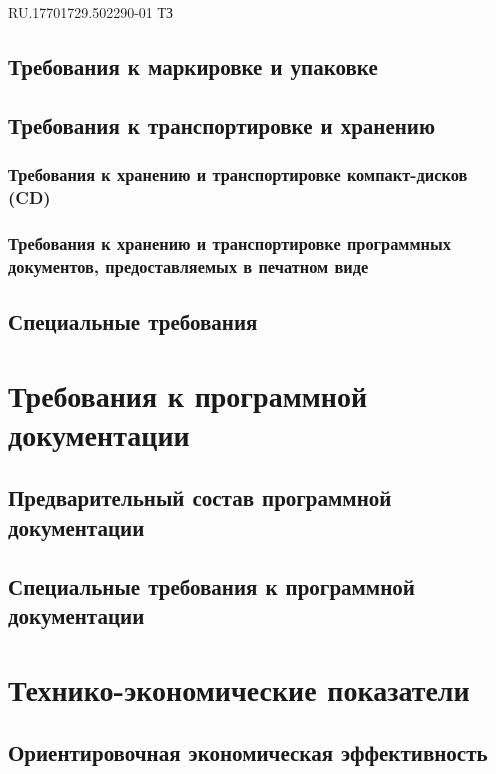 \begin{uspd}{RU.17701729.502290-01 ТЗ}
    

\subsection{Требования к маркировке и упаковке}

    
\subsection{Требования к транспортировке и хранению}

    \subsubsection{Требования к хранению и транспортировке компакт-дисков (CD)}

    
\subsubsection{Требования к хранению и транспортировке программных документов, предоставляемых в печатном виде}

    

\subsection{Специальные требования}

    

\section{Требования к программной документации}

    \subsection{Предварительный состав программной документации}

    
\subsection{Специальные требования к программной документации}

    

\section{Технико-экономические показатели}

    \subsection{Ориентировочная экономическая эффективность}


\end{uspd}
